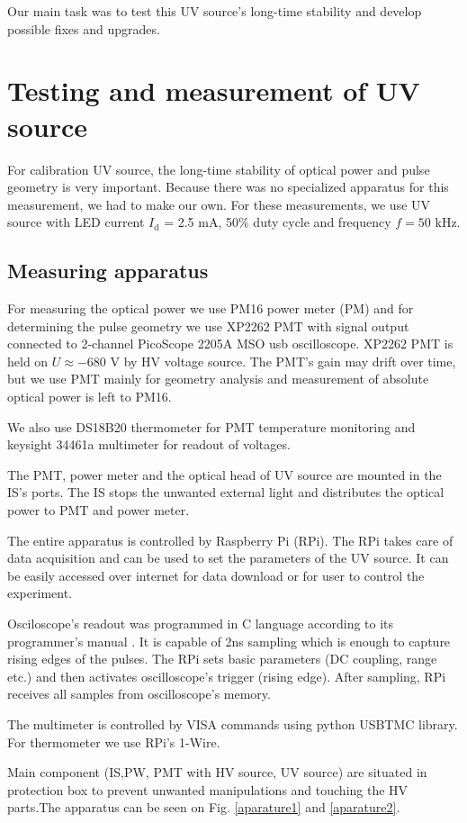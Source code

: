 Our main task was to test this UV source's long-time stability and develop possible fixes and upgrades.


\section{Testing and measurement of UV source}
For calibration UV source, the long-time stability of optical power and pulse geometry is very important. Because there was no specialized apparatus for this measurement, we had to make our own. For these measurements, we use UV source with LED current $I_{\textrm{d}}$ = 2.5 mA, 50$\%$ duty cycle and frequency $f = 50$ kHz. 
\subsection{Measuring apparatus}
For measuring the optical power we use PM16 power meter (PM) and for determining the pulse geometry we use XP2262 PMT with signal output connected to 2-channel PicoScope 2205A MSO usb oscilloscope. XP2262 PMT is held on $U \approx -680$ V by HV voltage source. The PMT's gain may drift over time, but we use PMT mainly for geometry analysis and measurement of absolute optical power is left to PM16.
\par
We also use DS18B20 thermometer for PMT temperature monitoring and keysight 34461a multimeter for readout of voltages.

\par
The PMT, power meter and the optical head of UV source are mounted in the IS's ports. The IS stops the unwanted external light and distributes the optical power to PMT and power meter. 
\par
The entire apparatus is controlled by Raspberry Pi (RPi). The RPi takes care of data acquisition and can be used to set the parameters of the UV source. It can be easily accessed over internet for data download or for user to control the experiment.
\par
Osciloscope's readout was programmed in C language according to its programmer's manual \cite{PicoScope}. It is capable of 2ns sampling which is enough to capture rising edges of the pulses. The RPi sets basic parameters (DC coupling, range etc.) and then activates oscilloscope's trigger (rising edge). After sampling, RPi receives all samples from oscilloscope's memory.
\par
The multimeter is controlled by VISA commands using python USBTMC library. For thermometer we use RPi's 1-Wire.
\par
Main component (IS,PW, PMT with HV source, UV source) are situated in protection box to prevent unwanted manipulations and touching the HV parts.The apparatus can be seen on Fig. \ref{aparature1} and \ref{aparature2}.


